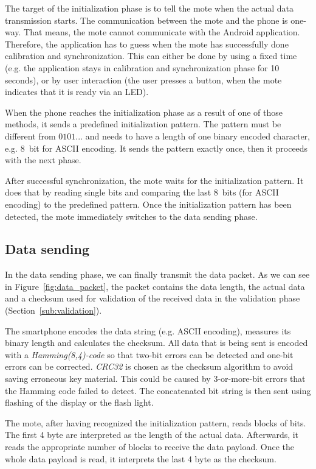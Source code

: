 \documentclass{sig-alternate} %
\begin{document}
The target of the initialization phase is to tell the mote when the actual data transmission starts.
The communication between the mote and the phone is one-way.
That means, the mote cannot communicate with the Android application.
Therefore, the application has to guess when the mote has successfully done calibration and synchronization.
This can either be done by using a fixed time (e.g. the application stays in calibration and synchronization phase for 10 seconds), or by user interaction (the user presses a button, when the mote indicates that it is ready via an LED).

When the phone reaches the initialization phase as a result of one of those methods, it sends a predefined initialization pattern.
The pattern must be different from $0101...$ and needs to have a length of one binary encoded character, e.g. 8~bit for ASCII encoding.
It sends the pattern exactly once, then it proceeds with the next phase.

After successful synchronization, the mote waits for the initialization pattern.
It does that by reading single bits and comparing the last 8~bits (for ASCII encoding) to the predefined pattern.
Once the initialization pattern has been detected, the mote immediately switches to the data sending phase.

\subsection{Data sending}
\label{sub:data_sending}

In the data sending phase, we can finally transmit the data packet.
As we can see in Figure~\ref{fig:data_packet}, the packet contains the data length, the actual data and a checksum used for validation of the received data in the validation phase (Section~\ref{sub:validation}).

The smartphone encodes the data string (e.g. ASCII encoding), measures its binary length and calculates the checksum.
All data that is being sent is encoded with a \textit{Hamming(8,4)-code} so that two-bit errors can be detected and one-bit errors can be corrected.
\textit{CRC32} is chosen as the checksum algorithm to avoid saving erroneous key material.
This could be caused by 3-or-more-bit errors that the Hamming code failed to detect.
The concatenated bit string is then sent using flashing of the display or the flash light.

The mote, after having recognized the initialization pattern, reads blocks of bits.
The first 4 byte are interpreted as the length of the actual data.
Afterwards, it reads the appropriate number of blocks to receive the data payload.
Once the whole data payload is read, it interprets the last 4 byte as the checksum.
\end{document}
